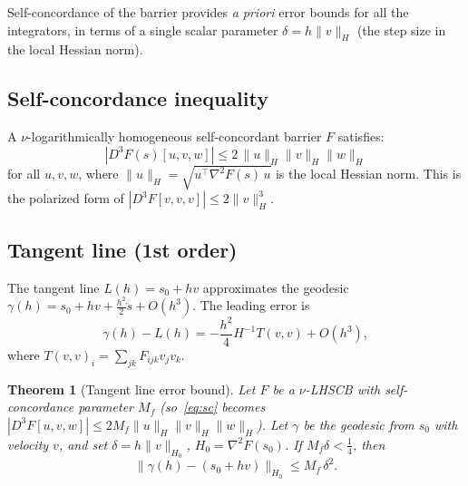 \documentclass[11pt]{article}
\newtheorem{theorem}{Theorem}
\begin{document}
Self-concordance of the barrier provides \emph{a priori} error bounds
for all the integrators, in terms of a single scalar parameter
$\delta = h \|v\|_H$ (the step size in the local Hessian norm).

\subsection{Self-concordance inequality}

A $\nu$-logarithmically homogeneous self-concordant barrier $F$
satisfies:
\begin{equation}\label{eq:sc}
  |D^3 F(s)[u, v, w]| \leq 2\, \|u\|_H \|v\|_H \|w\|_H
\end{equation}
for all $u, v, w$, where $\|u\|_H = \sqrt{u^\top \nabla^2 F(s)\, u}$
is the local Hessian norm.  This is the polarized form of
$|D^3 F[v,v,v]| \leq 2\|v\|_H^3$.

\subsection{Tangent line (1st order)}

The tangent line $L(h) = s_0 + hv$ approximates the geodesic
$\gamma(h) = s_0 + hv + \frac{h^2}{2}\ddot{s} + O(h^3)$.
The leading error is
\[
  \gamma(h) - L(h) = -\frac{h^2}{4} H^{-1} T(v,v) + O(h^3),
\]
where $T(v,v)_i = \sum_{jk} F_{ijk} v_j v_k$.

\begin{theorem}[Tangent line error bound]\label{thm:euler-bound}
Let $F$ be a $\nu$-LHSCB with self-concordance
parameter $M_f$ (so~\eqref{eq:sc} becomes $|D^3 F[u,v,w]| \leq
2M_f\|u\|_H\|v\|_H\|w\|_H$).  Let $\gamma$ be the geodesic
from $s_0$ with velocity $v$, and set $\delta = h\|v\|_{H_0}$,
$H_0 = \nabla^2 F(s_0)$.  If $M_f \delta < \frac{1}{4}$, then
\begin{equation}\label{eq:tangent-bound}
  \|\gamma(h) - (s_0 + hv)\|_{H_0} \leq M_f\,\delta^2.
\end{equation}
\end{theorem}
\end{document}
